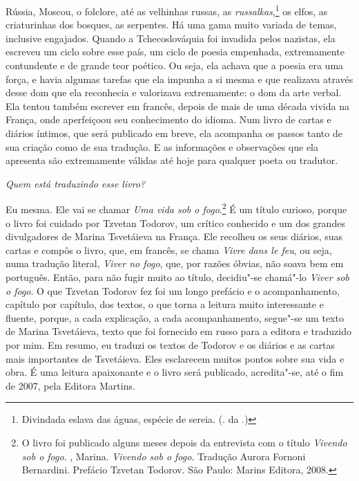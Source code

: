 Rússia, Moscou, o folclore, até as velhinhas russas, as
\emph{russalkas},\footnote{Divindada eslava das águas, espécie de
  sereia. (. da .)} os elfos, as criaturinhas dos bosques, as
serpentes. Há uma gama muito variada de temas, inclusive engajados.
Quando a Tchecoslováquia foi invadida pelos nazistas, ela escreveu um
ciclo sobre esse país, um ciclo de poesia empenhada, extremamente
contundente e de grande teor poético. Ou seja, ela achava que a poesia
era uma força, e havia algumas tarefas que ela impunha a si mesma e que
realizava através desse dom que ela reconhecia e valorizava
extremamente: o dom da arte verbal. Ela tentou também escrever em
francês, depois de mais de uma década vivida na França, onde aperfeiçoou
seu conhecimento do idioma. Num livro de cartas e diários íntimos, que
será publicado em breve, ela acompanha os passos tanto de sua criação
como de sua tradução. E as informações e observações que ela apresenta
são extremamente válidas até hoje para qualquer poeta ou tradutor.

\medskip

\emph{Quem está traduzindo esse livro?}

Eu mesma. Ele vai se chamar \emph{Uma vida sob o
fogo}.\footnote{O livro foi publicado alguns meses depois da entrevista com o título
  \emph{Vivendo sob o fogo}. , Marina. \emph{Vivendo sob o
  fogo}. Tradução Aurora Fornoni Bernardini. Prefácio Tzvetan Todorov.
  São Paulo: Marins Editora, 2008.} É um título curioso, porque o livro
foi cuidado por Tzvetan Todorov, um crítico conhecido e um dos grandes
divulgadores de Marina Tsvetáieva na França. Ele recolheu os seus
diários, suas cartas e compôs o livro, que, em francês, se chama
\emph{Vivre dans le feu}, ou seja, numa tradução literal, \emph{Viver no
fogo}, que, por razões óbvias, não soava bem em português. Então, para
não fugir muito ao título, decidiu"-se chamá"-lo \emph{Viver sob o fogo}.
O que Tzvetan Todorov fez foi um longo prefácio e o acompanhamento,
capítulo por capítulo, dos textos, o que torna a leitura muito
interessante e fluente, porque, a cada explicação, a cada
acompanhamento, segue"-se um texto de Marina Tsvetáieva, texto que foi
fornecido em russo para a editora e traduzido por mim. Em resumo, eu
traduzi os textos de Todorov e os diários e as cartas mais importantes
de Tsvetáieva. Eles esclarecem muitos pontos sobre sua vida e obra. É
uma leitura apaixonante e o livro será publicado, acredita"-se, até o fim
de 2007, pela Editora Martins.


